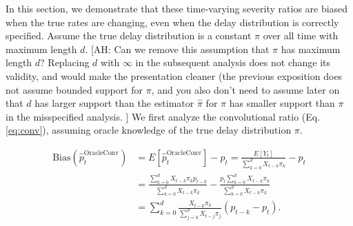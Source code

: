 \documentclass{article}
\newcommand{\ahcomment}[1]{{\color{teal}[AH: #1]}}
\begin{document}
In this section, we demonstrate that these time-varying severity ratios are biased when the true rates are changing, even when the delay distribution is correctly specified. Assume the true delay distribution is a constant $\pi$ over all time with maximum length $d$. 
\ahcomment{
  Can we remove this assumption that $\pi$ has maximum length $d$?  Replacing
  $d$ with $\infty$ in the subsequent analysis does not change its validity,
  and would make the presentation cleaner (the previous exposition does not
  assume bounded support for $\pi$, and you also don't need to assume later
  on that $d$ has larger support than the estimator $\hat{\pi}$ for $\pi$
  has smaller support than $\pi$ in the misspecified analysis.
}
We first analyze the convolutional ratio (Eq. \ref{eq:conv}), assuming oracle knowledge of the true delay distribution $\pi$.


\begin{align}\label{eq:ConvBias}
    \text{Bias}(\hat{p}_t^\text{OracleConv}) &= E[\hat{p}_t^\text{OracleConv}] - p_t = \frac{E[Y_t]}{\sum_{k=0}^d X_{t-k}\pi_k} - p_t \nonumber\\ 
    &= \frac{\sum_{k=0}^d X_{t-k}\pi_k p_{t-k}}{\sum_{k=0}^d X_{t-k}\pi_k} - \frac{p_t \sum_{k=0}^d X_{t-k}\pi_k}{\sum_{k=0}^d X_{t-k}\pi_k}\nonumber\\
    &= \sum_{k=0}^d \frac{X_{t-k}\pi_k}{\sum_{j=0}^d X_{t-j}\pi_j} (p_{t-k}-p_t).
\end{align}
\end{document}
